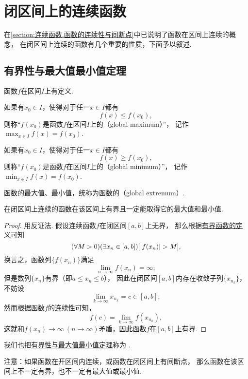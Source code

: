 \section{闭区间上的连续函数}
在\cref{section:连续函数.函数的连续性与间断点}中已说明了函数在区间上连续的概念，
在闭区间上连续的函数有几个重要的性质，下面予以叙述.

\subsection{有界性与最大值最小值定理}
\begin{definition}
函数\(f\)在区间\(I\)上有定义.

如果有\(x_0 \in I\)，使得对于任一\(x \in I\)都有\[
	f(x) \leq f(x_0),
\]
则称“\(f(x_0)\)是函数\(f\)在区间\(I\)上的（global maximum）”，
记作\(\max_{x \in I} f(x) = f(x_0)\).

如果有\(x_0 \in I\)，使得对于任一\(x \in I\)都有\[
	f(x) \geq f(x_0),
\]
则称“\(f(x_0)\)是函数\(f\)在区间\(I\)上的（global minimum）”，
记作\(\min_{x \in I} f(x) = f(x_0)\).
\end{definition}
函数的最大值、最小值，统称为函数的（global extremum）.

\begin{theorem}[有界性与最大值最小值定理]\label{theorem:极限.最值定理}
在闭区间上连续的函数在该区间上有界且一定能取得它的最大值和最小值.
\begin{proof}
用反证法.
假设连续函数\(f\)在闭区间\([a,b]\)上无界，
那么根据\hyperref[definition:函数.函数的有界性]{有界函数的定义}可知\[
	(\forall M>0)
	(\exists x_n\in[a,b])
	[\abs{f(x_n)} > M],
\]
换言之，函数列\(\{f(x_n)\}\)满足\[
	\lim_{n\to\infty} f(x_n) = \infty;
\]
但是数列\(\{x_n\}\)有界（即\(a \leq x_n \leq b\)），
因此在闭区间\([a,b]\)内存在收敛子列\(\{x_{n_k}\}\)，
不妨设\[
	\lim_{k\to\infty} x_{n_k} = c \in [a,b];
\]
然而根据函数\(f\)的连续性可知，\[
	f(c) = \lim_{k\to\infty} f(x_{n_k}),
\]
这就和\(f(x_n)\to\infty\ (n\to\infty)\)矛盾，因此函数\(f\)在\([a,b]\)上有界.
\end{proof}
\end{theorem}
我们也把\hyperref[theorem:极限.最值定理]{有界性与最大值最小值定理}称为%
.

注意：如果函数在开区间内连续，或函数在闭区间上有间断点，
那么函数在该区间上不一定有界，也不一定有最大值或最小值.

